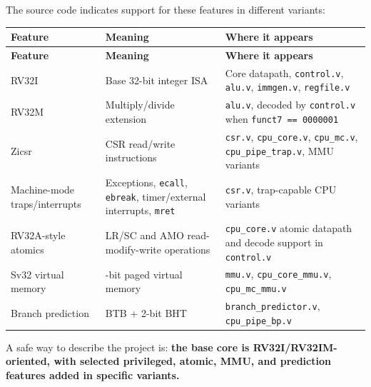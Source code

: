 The source code indicates support for these features in different variants:

\begin{longtable}{|>{\RaggedRight\arraybackslash}p{}|>{\RaggedRight\arraybackslash}p{}|>{\RaggedRight\arraybackslash}p{}|}
\hline
\textbf{Feature} & \textbf{Meaning} & \textbf{Where it appears} \\
\hline
\endfirsthead
\hline
\textbf{Feature} & \textbf{Meaning} & \textbf{Where it appears} \\
\hline
\endhead
RV32I & Base 32-bit integer ISA & Core datapath, \texttt{control.v}, \texttt{alu.v}, \texttt{immgen.v}, \texttt{regfile.v} \\
\hline
RV32M & Multiply/divide extension & \texttt{alu.v}, decoded by \texttt{control.v} when \texttt{funct7 == 0000001} \\
\hline
Zicsr & CSR read/write instructions & \texttt{csr.v}, \texttt{cpu\_core.v}, \texttt{cpu\_mc.v}, \texttt{cpu\_pipe\_trap.v}, MMU variants \\
\hline
Machine-mode traps/interrupts & Exceptions, \texttt{ecall}, \texttt{ebreak}, timer/external interrupts, \texttt{mret} & \texttt{csr.v}, trap-capable CPU variants \\
\hline
RV32A-style atomics & LR/SC and AMO read-modify-write operations & \texttt{cpu\_core.v} atomic datapath and decode support in \texttt{control.v} \\
\hline
Sv32 virtual memory & 32-bit paged virtual memory & \texttt{mmu.v}, \texttt{cpu\_core\_mmu.v}, \texttt{cpu\_mc\_mmu.v} \\
\hline
Branch prediction & BTB + 2-bit BHT & \texttt{branch\_predictor.v}, \texttt{cpu\_pipe\_bp.v} \\
\hline
\end{longtable}

A safe way to describe the project is: \textbf{the base core is RV32I/RV32IM-oriented, with selected privileged, atomic, MMU, and prediction features added in specific variants.}

\bigskip
